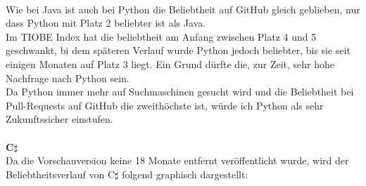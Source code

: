 \documentclass[ngerman]{article}
\begin{document}
\begin{figure}[h!]
\begin{subfigure}[h!]{.5\textwidth}
        \end{subfigure}
    \end{figure}\\
    Wie bei Java ist auch bei Python die Beliebtheit auf GitHub gleich geblieben, nur dass Python mit Platz 2 beliebter ist als Java.\\
    Im TIOBE Index hat die beliebtheit am Anfang zwischen Platz 4 und 5 geschwankt, bi dem späteren Verlauf wurde Python jedoch beliebter, bis sie seit einigen Monaten auf Platz 3 liegt. Ein Grund dürfte die, zur Zeit, sehr hohe Nachfrage nach Python sein.\\
    Da Python immer mehr auf Suchmaschinen gesucht wird und die Beliebtheit bei Pull-Requests auf GitHub die zweithöchste ist, würde ich Python als sehr Zukunftssicher einstufen.\\\\
    \textbf{C$\sharp$}\\
    Da die Vorschauversion keine 18 Monate entfernt veröffentlicht wurde, wird der Beliebtheitsverlauf von C$\sharp$ folgend graphisch dargestellt:
\end{document}
